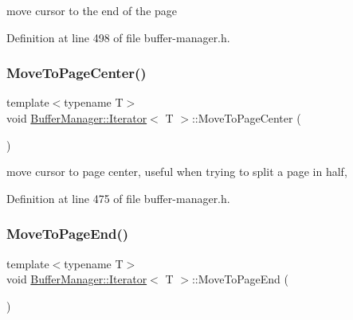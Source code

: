 move cursor to the end of the page 

Definition at line 498 of file buffer-\/manager.\+h.

\mbox{\label{class_buffer_manager_1_1_iterator_a20b703d6135c5e3026eab944a32ca186}} 
\subsubsection{\texorpdfstring{MoveToPageCenter()}{MoveToPageCenter()}}
{\footnotesize\ttfamily template$<$typename T$>$ \\
void \mbox{\hyperlink{class_buffer_manager_1_1_iterator}{Buffer\+Manager\+::\+Iterator}}$<$ T $>$\+::Move\+To\+Page\+Center (\begin{DoxyParamCaption}{ }\end{DoxyParamCaption})\hspace{0.3cm}{\ttfamily [inline]}}

move cursor to page center, useful when trying to split a page in half, 
\begin{DoxyCode}{0}
\end{DoxyCode}
 

Definition at line 475 of file buffer-\/manager.\+h.

\mbox{\label{class_buffer_manager_1_1_iterator_a88ae36356076d25c8959ecfbaa084d9f}} 
\subsubsection{\texorpdfstring{MoveToPageEnd()}{MoveToPageEnd()}}
{\footnotesize\ttfamily template$<$typename T$>$ \\
void \mbox{\hyperlink{class_buffer_manager_1_1_iterator}{Buffer\+Manager\+::\+Iterator}}$<$ T $>$\+::Move\+To\+Page\+End (\begin{DoxyParamCaption}{ }\end{DoxyParamCaption})\hspace{0.3cm}{\ttfamily [inline]}}

